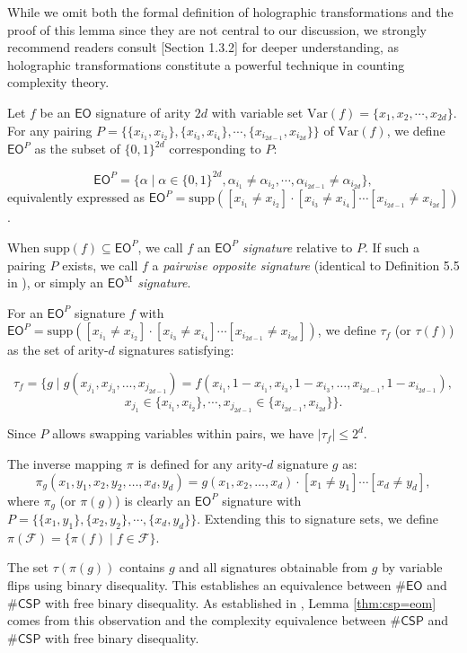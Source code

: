 \documentclass[a4paper,UKenglish,cleveref, autoref, thm-restate]{lipics-v2021}
\newcommand{\eo}[0]{\textsf{EO}}
\newcommand{\csp}[0]{\textsf{CSP}}
\newcommand{\su}[0]{\text{supp}}
\newcommand{\eom}[1][\text{M}]{\textsf{EO}^{#1}}
\begin{document}
While we omit both the formal definition of holographic transformations and the proof of this lemma since they are not central to our discussion, we strongly recommend readers consult \cite{cai2017complexity}[Section 1.3.2] for deeper understanding, as holographic transformations constitute a powerful technique in counting complexity theory.

Let $f$ be an $\eo$ signature of arity $2d$ with variable set $\text{Var}(f)=\{x_1, x_2, \cdots, x_{2d}\}$. For any pairing $P=\{\{x_{i_1},x_{i_2}\},\{x_{i_3},x_{i_4}\},\cdots,\{x_{i_{2d-1}},x_{i_{2d}}\}\}$ of $\text{Var}(f)$, we define $\eom[P]$ as the subset of $\{0,1\}^{2d}$ corresponding to $P$:

$$\eom[P]=\{\alpha \mid \alpha \in \{0,1\}^{2d}, \alpha_{i_1} \neq \alpha_{i_2}, \cdots, \alpha_{i_{2d-1}} \neq \alpha_{i_{2d}}\},$$
equivalently expressed as $\eom[P]=\su([x_{i_1}\neq x_{i_2}] \cdot [x_{i_3}\neq x_{i_4}] \cdots [x_{i_{2d-1}}\neq x_{i_{2d}}])$.

When $\su(f) \subseteq \eom[P]$, we call $f$ an \textit{$\eom[P]$ signature} relative to $P$. If such a pairing $P$ exists, we call $f$ a \textit{pairwise opposite signature} (identical to Definition 5.5 in \cite{cai2020beyond}), or simply an \textit{$\eom$ signature}.

For an $\eom[P]$ signature $f$ with $\eom[P]=\su([x_{i_1}\neq x_{i_2}] \cdot [x_{i_3}\neq x_{i_4}] \cdots [x_{i_{2d-1}}\neq x_{i_{2d}}])$, we define $\tau_f$ (or $\tau(f)$) as the set of arity-$d$ signatures satisfying:

$$ \tau_f = \{g\mid g(x_{j_1},x_{j_3},...,x_{j_{2d-1}})=f(x_{i_1},1-x_{i_1}, x_{i_3},1-x_{i_3},\ldots,x_{i_{2d-1}},1-x_{i_{2d-1}}),$$
$$x_{j_1}\in\{x_{i_1},x_{i_2}\},\cdots,x_{j_{2d-1}}\in\{x_{i_{2d-1}},x_{i_{2d}}\}\}.$$

Since $P$ allows swapping variables within pairs, we have $|\tau_f|\leq 2^d$.

The inverse mapping $\pi$ is defined for any arity-$d$ signature $g$ as:
$$\pi_g(x_1,y_1,x_2,y_2,\ldots, x_d, y_d)= g(x_1,x_2,\ldots,x_d) \cdot [x_1 \neq y_1] \cdots [x_d \neq y_d],$$
where $\pi_g$ (or $\pi(g)$) is clearly an $\eom[P]$ signature with $P=\{\{x_1,y_1\},\{x_2,y_2\},\cdots,\{x_d,y_d\}\}$. Extending this to signature sets, we define $\pi(\mathcal{F})=\{\pi(f)\mid f\in\mathcal{F}\}$. 

The set $\tau(\pi(g))$ contains $g$ and all signatures obtainable from $g$ by variable flips using binary disequality. This establishes an equivalence between $\#\eo$ and $\#\csp$ with free binary disequality. As established in \cite{cai2020beyond}, Lemma \ref{thm:csp=eom} comes from this observation and the complexity equivalence between $\#\csp$ and $\#\csp$ with free binary disequality.
\end{document}
